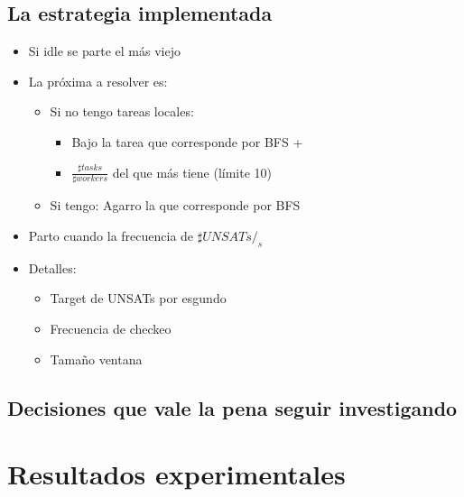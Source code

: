 
\subsection{La estrategia implementada}


\begin{itemize}
	\item Si idle se parte el más viejo
	\item La próxima a resolver es:
		\begin{itemize}
			\item Si no tengo tareas locales:
				\begin{itemize}
					\item Bajo la tarea que corresponde por BFS +
					\item $\frac{\sharp tasks}{\sharp workers}$ del que más tiene (límite 10)
				\end{itemize}
			\item Si tengo: Agarro la que corresponde por BFS
		\end{itemize}
	\item Parto cuando la frecuencia de $\sharp UNSATs/_s$
	\item Detalles:
	\begin{itemize}
		\item Target de UNSATs por esgundo
		\item Frecuencia de checkeo
		\item Tamaño ventana
	\end{itemize}
\end{itemize}

\subsection{Decisiones que vale la pena seguir investigando}

\section{Resultados experimentales}

